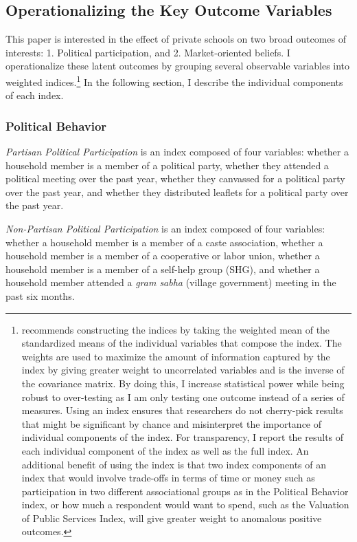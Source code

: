 \documentclass[hidelinks, 12pt, titlepage]{article}
\begin{document}
	\subsection*{Operationalizing the Key Outcome Variables}

		This paper is interested in the effect of private schools on two broad outcomes of interests: 1. Political participation, and 2. Market-oriented beliefs.  I operationalize these latent outcomes by grouping several observable variables into weighted indices.\footnote{\cite{Anderson2008} recommends constructing the indices by taking the weighted mean of the standardized means of the individual variables that compose the index.  The weights are used to maximize the amount of information captured by the index by giving greater weight to uncorrelated variables and is the inverse of the covariance matrix.  By doing this, I increase statistical power while being robust to over-testing as I am only testing one outcome instead of a series of measures.  Using an index ensures that researchers do not cherry-pick results that might be significant by chance and misinterpret the importance of individual components of the index.  For transparency, I report the results of each individual component of the index as well as the full index. An additional benefit of using the index is that two index components of an index that would involve trade-offs in terms of time or money such as participation in two different associational groups as in the Political Behavior index, or how much a respondent would want to spend, such as the Valuation of Public Services Index, will give greater weight to anomalous positive outcomes.}  In the following section, I describe the individual components of each index.

	\subsubsection*{Political Behavior}

		\emph{Partisan Political Participation} is an index composed of four variables: whether a household member is a member of a political party, whether they attended a political meeting over the past year, whether they canvassed for a political party over the past year, and whether they distributed leaflets for a political party over the past year.

		\emph{Non-Partisan Political Participation} is an index composed of four variables: whether a household member is a member of a caste association, whether a household member is a member of a cooperative or labor union, whether a household member is a member of a self-help group (SHG), and whether a household member attended a \emph{gram sabha} (village government) meeting in the past six months.
\end{document}
